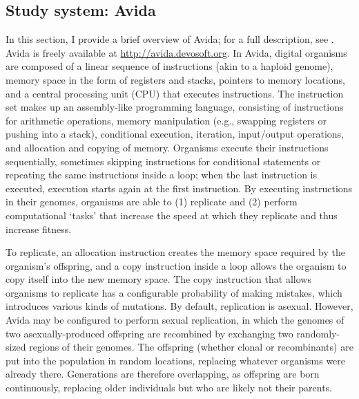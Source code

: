 \begin{doublespace}
\section*{Study system: Avida}
\label{sec:avida}

In this section, I provide a brief overview of Avida;
for a full description, see \cite{ofr04}.
%
Avida is freely available at \url{http://avida.devosoft.org}.
%
In Avida, digital organisms are composed of
a linear sequence of instructions (akin to a haploid genome),
memory space in the form of registers and stacks,
pointers to memory locations,
and a central processing unit (CPU) that executes instructions.
%
The instruction set makes up an assembly-like programming language,
consisting of instructions for arithmetic operations,
memory manipulation (e.g., swapping registers or pushing into a stack),
conditional execution, iteration, input/output operations,
and allocation and copying of memory.
%
Organisms execute their instructions sequentially,
sometimes skipping instructions for conditional statements
or repeating the same instructions inside a loop;
when the last instruction is executed,
execution starts again at the first instruction.
%
By executing instructions in their genomes,
organisms are able to (1) replicate and (2) perform computational `tasks'
that increase the speed at which they replicate and thus increase fitness.



To replicate, an allocation instruction creates the memory space
required by the organism's offspring, and a copy instruction inside a loop
allows the organism to copy itself into the new memory space.
%
The copy instruction that allows organisms to replicate
has a configurable probability of making mistakes,
which introduces various kinds of mutations.
%
By default, replication is asexual.
%
However, Avida may be configured to perform sexual replication,
in which the genomes of two asexually-produced offspring are recombined
by exchanging two randomly-sized regions of their genomes.
%
The offspring (whether clonal or recombinants) are put into the population
in random locations, replacing whatever organisms were already there.
%
Generations are therefore overlapping, as offspring are born continuously,
replacing older individuals but who are likely not their parents.




\end{doublespace}
